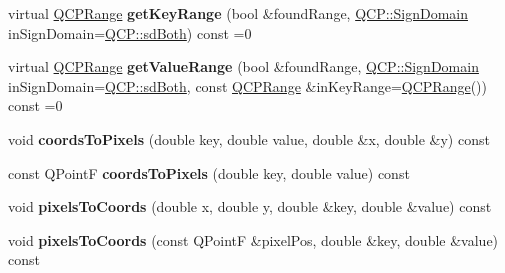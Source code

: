\begin{DoxyCompactItemize}
\item 
virtual \hyperlink{class_q_c_p_range}{Q\+C\+P\+Range} {\bfseries get\+Key\+Range} (bool \&found\+Range, \hyperlink{namespace_q_c_p_afd50e7cf431af385614987d8553ff8a9}{Q\+C\+P\+::\+Sign\+Domain} in\+Sign\+Domain=\hyperlink{namespace_q_c_p_afd50e7cf431af385614987d8553ff8a9a3dee7e9cd2fedce9253b83e172626a6c}{Q\+C\+P\+::sd\+Both}) const =0\hypertarget{class_q_c_p_abstract_plottable_a56b4d9000f4de0de86c566c84eb05a21}{}\label{class_q_c_p_abstract_plottable_a56b4d9000f4de0de86c566c84eb05a21}

\item 
virtual \hyperlink{class_q_c_p_range}{Q\+C\+P\+Range} {\bfseries get\+Value\+Range} (bool \&found\+Range, \hyperlink{namespace_q_c_p_afd50e7cf431af385614987d8553ff8a9}{Q\+C\+P\+::\+Sign\+Domain} in\+Sign\+Domain=\hyperlink{namespace_q_c_p_afd50e7cf431af385614987d8553ff8a9a3dee7e9cd2fedce9253b83e172626a6c}{Q\+C\+P\+::sd\+Both}, const \hyperlink{class_q_c_p_range}{Q\+C\+P\+Range} \&in\+Key\+Range=\hyperlink{class_q_c_p_range}{Q\+C\+P\+Range}()) const =0\hypertarget{class_q_c_p_abstract_plottable_aa81c95aec08d86cdd5407e48b83ab186}{}\label{class_q_c_p_abstract_plottable_aa81c95aec08d86cdd5407e48b83ab186}

\item 
void {\bfseries coords\+To\+Pixels} (double key, double value, double \&x, double \&y) const \hypertarget{class_q_c_p_abstract_plottable_ade710a776104b14c1c835168ce1bfc5c}{}\label{class_q_c_p_abstract_plottable_ade710a776104b14c1c835168ce1bfc5c}

\item 
const Q\+PointF {\bfseries coords\+To\+Pixels} (double key, double value) const \hypertarget{class_q_c_p_abstract_plottable_a9fd1c9df8391781f05b0be22fbe91e13}{}\label{class_q_c_p_abstract_plottable_a9fd1c9df8391781f05b0be22fbe91e13}

\item 
void {\bfseries pixels\+To\+Coords} (double x, double y, double \&key, double \&value) const \hypertarget{class_q_c_p_abstract_plottable_a10408828446e9e0681c46d65120f382e}{}\label{class_q_c_p_abstract_plottable_a10408828446e9e0681c46d65120f382e}

\item 
void {\bfseries pixels\+To\+Coords} (const Q\+PointF \&pixel\+Pos, double \&key, double \&value) const \hypertarget{class_q_c_p_abstract_plottable_a3e2c361cfcdfd5d803ada4d333a07e15}{}\label{class_q_c_p_abstract_plottable_a3e2c361cfcdfd5d803ada4d333a07e15}


\end{DoxyCompactItemize}
